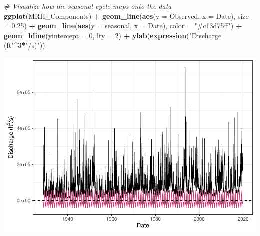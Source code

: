 \documentclass[12pt,]{article}
\newenvironment{Shaded}{\begin{snugshade}}{\end{snugshade}}
\newcommand{\CommentTok}[1]{\textcolor[rgb]{0.56,0.35,0.01}{\textit{#1}}}
\newcommand{\DataTypeTok}[1]{\textcolor[rgb]{0.13,0.29,0.53}{#1}}
\newcommand{\DecValTok}[1]{\textcolor[rgb]{0.00,0.00,0.81}{#1}}
\newcommand{\FloatTok}[1]{\textcolor[rgb]{0.00,0.00,0.81}{#1}}
\newcommand{\KeywordTok}[1]{\textcolor[rgb]{0.13,0.29,0.53}{\textbf{#1}}}
\newcommand{\NormalTok}[1]{#1}
\newcommand{\OperatorTok}[1]{\textcolor[rgb]{0.81,0.36,0.00}{\textbf{#1}}}
\newcommand{\StringTok}[1]{\textcolor[rgb]{0.31,0.60,0.02}{#1}}
\begin{document}
\begin{Shaded}
\begin{Highlighting}[]
\CommentTok{# Visualize how the seasonal cycle maps onto the data}
\KeywordTok{ggplot}\NormalTok{(MRH_Components) }\OperatorTok{+}
\StringTok{  }\KeywordTok{geom_line}\NormalTok{(}\KeywordTok{aes}\NormalTok{(}\DataTypeTok{y =}\NormalTok{ Observed, }\DataTypeTok{x =}\NormalTok{ Date),  }\DataTypeTok{size =} \FloatTok{0.25}\NormalTok{) }\OperatorTok{+}
\StringTok{  }\KeywordTok{geom_line}\NormalTok{(}\KeywordTok{aes}\NormalTok{(}\DataTypeTok{y =}\NormalTok{ seasonal, }\DataTypeTok{x =}\NormalTok{ Date), }\DataTypeTok{color =} \StringTok{"#c13d75ff"}\NormalTok{) }\OperatorTok{+}
\StringTok{  }\KeywordTok{geom_hline}\NormalTok{(}\DataTypeTok{yintercept =} \DecValTok{0}\NormalTok{, }\DataTypeTok{lty =} \DecValTok{2}\NormalTok{) }\OperatorTok{+}
\StringTok{  }\KeywordTok{ylab}\NormalTok{(}\KeywordTok{expression}\NormalTok{(}\StringTok{"Discharge (ft"}\OperatorTok{^}\DecValTok{3}\OperatorTok{*}\StringTok{"/s)"}\NormalTok{))}
\end{Highlighting}
\end{Shaded}

\includegraphics{Project_Template_files/figure-latex/unnamed-chunk-6-13.pdf}

\begin{Shaded}
\end{Shaded}
\end{document}
